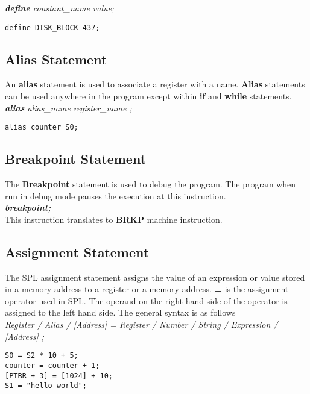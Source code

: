 \documentclass[11pt]{article}
\begin{document}
\textit{ \textbf{define} constant\_name value; }

\begin{verbatim}
define DISK_BLOCK 437;
\end{verbatim}


\subsection{Alias Statement}
An \textbf{alias} statement is used to associate a register with a name. \textbf{Alias} statements can be used anywhere in the program except within \textbf{if} and \textbf{while} statements.\\

\indent \textit{ \textbf{alias}  alias\_name register\_name ;} 

\begin{verbatim}
alias counter S0;
\end{verbatim}

\subsection{Breakpoint Statement}
The \textbf{Breakpoint} statement is used to debug the program. The program when run in debug mode pauses the execution at this instruction.\\

  \textit{ \textbf{breakpoint; }}\\

This instruction translates to \textbf{BRKP} machine instruction.

\subsection{Assignment Statement}
The SPL assignment statement assigns the value of an expression or value stored in a memory address to a register or a memory address. \textbf{=} is the assignment operator used in SPL. The operand on the right hand side of the operator is assigned to the left hand side. The general syntax is as follows\\

\indent \textit{ Register / Alias / [Address] = Register / Number / String / Expression / [Address] ;}

\begin{verbatim}
S0 = S2 * 10 + 5; 
counter = counter + 1; 
[PTBR + 3] = [1024] + 10; 
S1 = "hello world";
\end{verbatim}
\end{document}
